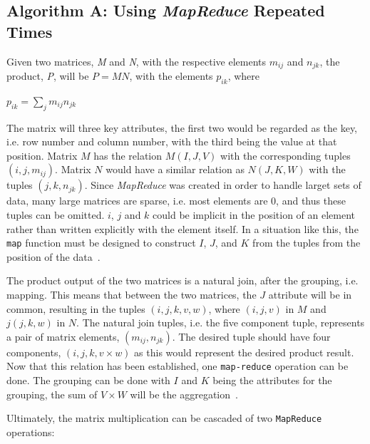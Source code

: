 \documentclass[10pt, conference]{IEEEtran}
\def\code#1{\texttt{#1}}
\begin{document}
\subsection{Algorithm A: Using \emph{MapReduce} Repeated Times}
\label{Algorithm A}
Given two matrices, \emph{M} and \emph{N}, with the respective elements $m_{ij}$ and $n_{jk}$, the product, \emph{P}, will be $P=MN$, with the elements $p_{ik}$, where

\begin{center}
$p_{ik} = \sum_{j}^{} m_{ij}n_{jk}
$
\end{center}

The matrix will three key attributes, the first two would be regarded as the key, i.e. row number and column number, with the third being the value at that position. Matrix $M$ has the relation $M(I,J,V)$ with the corresponding tuples $(i,j,m_{ij})$. Matrix $N$ would have a similar relation as $N(J,K,W)$ with the tuples $(j,k,n_{jk})$. Since \emph{MapReduce} was created in order to handle larget sets of data, many large matrices are sparse, i.e. most elements are 0, and thus these tuples can be omitted. $i$, $j$ and $k$ could be implicit in the position of an element rather than written explicitly with the element itself. In a situation like this, the \code{map} function must be designed to construct $I$, $J$, and $K$ from the tuples from the position of the data~\cite{Book}.

The product output of the two matrices is a natural join, after the grouping, i.e. mapping. This means that between the two matrices, the $J$ attribute will be in common, resulting in the tuples $(i,j,k,v,w)$, where $(i,j,v)$ in $M$ and $j(j,k,w)$ in $N$. The natural join tuples, i.e. the five component tuple, represents a pair of matrix elements, $(m_{ij}, n_{jk})$. The desired tuple should have four components, $(i,j,k, v\times w)$ as this would represent the desired product result. Now that this relation has been established, one \code{map-reduce} operation can be done. The grouping can be done with $I$ and $K$ being the attributes for the grouping, the sum of $V \times W$ will be the aggregation~\cite{Book}.

Ultimately, the matrix multiplication can be cascaded of two \code{MapReduce} operations:
\end{document}
